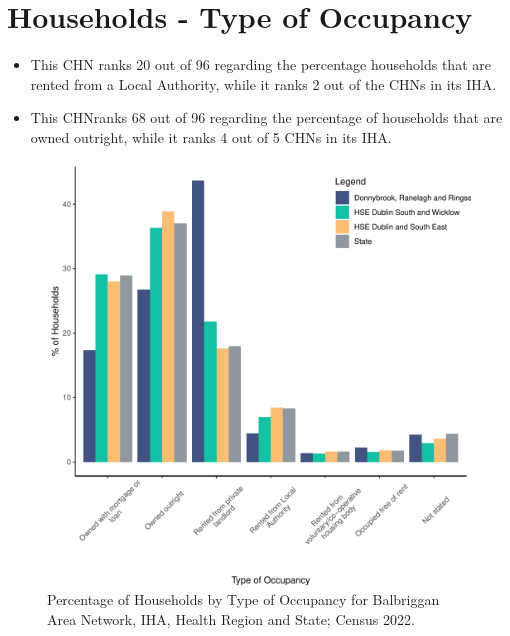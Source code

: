 \documentclass{article}
\begin{document}
\section{Households - Type of Occupancy}\label{sect:Households}
\begin{itemize}
\item This CHN ranks  20 out of 96 regarding the percentage households that are rented from a Local Authority, while it ranks  2 out of the CHNs in its IHA. 
\item This CHNranks  68 out of 96 regarding the percentage of households that are owned outright, while it ranks   4 out of 5 CHNs in its IHA.
\end{itemize}
\begin{figure}[H]
	\centering
	\includegraphics[width = 140mm]{../figures/HouseholdsED.pdf}
	\caption{Percentage of Households by Type of Occupancy for Balbriggan Area Network, IHA, Health Region and State; Census 2022.}
	\label{fig:vbnv}
	\end{figure}
\end{document}
